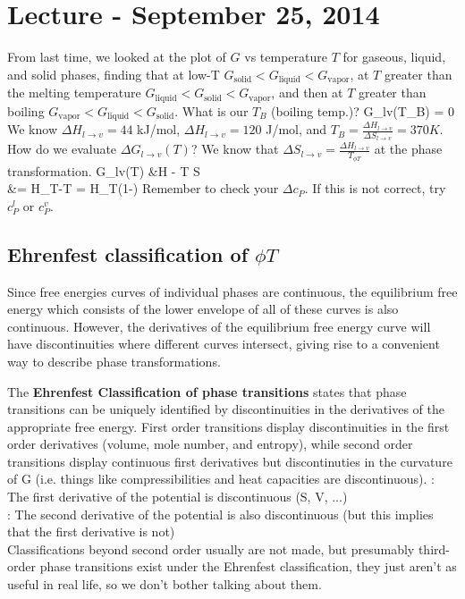 \documentclass[12pt]{article}
\begin{document}
\section{Lecture - September 25, 2014}
From last time, we looked at the plot of $G$ vs temperature $T$ for gaseous, liquid, and solid phases, finding that at low-T $G_\text{solid} < G_\text{liquid} <  G_\text{vapor}$, at $T$ greater than the melting temperature $G_\text{liquid} < G_\text{solid} <  G_\text{vapor}$, and then at $T$ greater than boiling $G_\text{vapor} < G_\text{liquid} <  G_\text{solid}$.  What is our $T_B$ (boiling temp.)?
\eqs
\Delta G_{l\rightarrow v}(T_B) = 0
\eqe
We know $\Delta H_{l\rightarrow v} = 44$ kJ/mol, $\Delta H_{l\rightarrow v} = 120$ J/mol, and $T_B = \frac{\Delta H_{l\rightarrow v}}{\Delta S_{l\rightarrow v}} = 370 K$.  How do we evaluate $\Delta G_{l\rightarrow v}(T)$?  We know that $\Delta S_{l\rightarrow v} = \frac{\Delta H_{l\rightarrow v}}{T_{\phi T}}$ at the phase transformation.
\eqs
\Delta G_{l\rightarrow v}(T) &\approx \Delta H - T \Delta S\\
&= \Delta H_{\phi T}-T = \Delta H_{\phi T}(1-)
\eqe
Remember to check your $\Delta c_P$.  If this is not correct, try $c_P^{l}$ or $c_P^{v}$.\\

\subsection{Ehrenfest classification of $\phi T$}
Since free energies curves of individual phases are continuous, the equilibrium free energy which consists of the lower envelope of all of these curves is also continuous. However, the derivatives of the equilibrium free energy curve will have discontinuities where different curves intersect, giving rise to a convenient way to describe phase transformations. 

The \textbf{Ehrenfest Classification of phase transitions} states that phase transitions can be uniquely identified by discontinuities in the derivatives of the appropriate free energy. First order transitions display discontinuities in the first order derivatives (volume, mole number, and entropy), while second order transitions display continuous first derivatives but discontinuties in the curvature of G (i.e. things like compressibilities and heat capacities are discontinuous).
:  The first derivative of the potential is discontinuous (S, V, ...)\\
:  The second derivative of the potential is also discontinuous (but this implies that the first derivative is not)\\
Classifications beyond second order usually are not made, but presumably third-order phase transitions exist under the Ehrenfest classification, they just aren't as useful in real life, so we don't bother talking about them.
\end{document}
